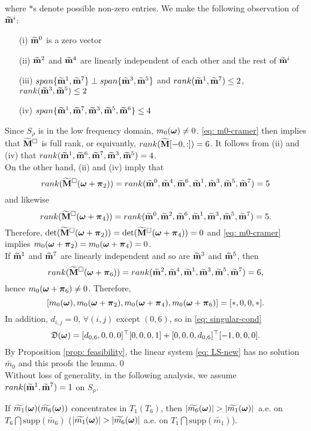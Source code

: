 where $*$s denote possible non-zero entries.
We make the following observation of $\mrow{i}$:
\begin{itemize}
\item[(i)] $\mrow{0}$ is a zero vector
\item[(ii)] $\mrow{2}$ and $\mrow{4}$ are linearly independent of each other and the rest of $\mrow{i}$
\item[(iii)] $span\{\mrow{1},\mrow{7}\} \perp span\{\mrow{3},\mrow{5}\}$ and $rank(\mrow{1},\mrow{7}) \leq 2$, \\$rank(\mrow{3},\mrow{5})\leq 2$
\item[(iv)] $span\{\mrow{1}, \mrow{7}, \mrow{3},\mrow{5},\mrow{6}\} \leq 4$
\end{itemize}
Since $S_\rho$ is in the low frequency domain, $m_0(\V{\omega})\neq 0$. \eqref{eq: m0-cramer} then implies that $\Msub$ is full rank, or equivantly, $rank(\M[-0,:]) = 6$. It follows from  (ii) and (iv) that $rank(\mrow{1},\mrow{6},\mrow{7},\mrow{3},\mrow{5})= 4$.\\
On the other hand, (ii) and (iv) imply that $$rank(\Msub(\V{\omega}+\V{\pi}_2))=rank(\mrow{0},\mrow{4},\mrow{6},\mrow{1},\mrow{3},\mrow{5},\mrow{7})= 5$$ and likewise $$rank(\Msub(\V{\omega}+\V{\pi}_4))=rank(\mrow{0},\mrow{2},\mrow{6},\mrow{1},\mrow{3},\mrow{5},\mrow{7})= 5.$$ Therefore, $\det(\Msub(\V{\omega} + \V{\pi}_2)) = \det(\Msub(\V{\omega} + \V{\pi}_4)) = 0$ and \eqref{eq: m0-cramer} implies $m_0(\V{\omega}+\V{\pi}_2) = m_0(\V{\omega}+\V{\pi}_4) = 0$.\\
If $\mrow{1}$ and $\mrow{7}$ are linearly independent and so are $\mrow{3}$ and $\mrow{5}$, then $$rank(\Msub(\V{\omega}+\V{\pi}_6))=rank(\mrow{2},\mrow{4},\mrow{1},\mrow{3},\mrow{5},\mrow{7}) = 6,$$ hence $m_0(\V{\omega}+\V{\pi}_6)\neq 0$. Therefore, $$[m_0(\V{\omega}),m_0(\V{\omega}+\V{\pi}_2),m_0(\V{\omega}+\V{\pi}_4),m_0(\V{\omega}+\V{\pi}_6)] = [*,0,0,*].$$ In addition, $d_{i,j} = 0,\, \forall(i,j)$ except $(0,6)$, so in \eqref{eq: singular-cond} $$\mathfrak{D}(\V{\omega}) = [d_{0,6}, 0, 0,0]^\top [0,0,0,1] + [0,0,0,d_{0,6}]^\top [-1,0,0,0].$$  By Proposition \ref{prop: feasibility}, the linear system \eqref{eq: LS-new} has no solution $\widetilde{m_0}$ and this proofs the lemma.\qed\\[.5em]
Without loss of generality, in the following analysis, we assume $rank(\mrow{1},\mrow{7}) = 1$ on $S_\rho$.
\begin{lemma}\label{lem: concentrate}
If $\m{1} (\m{6})$ concentrates in $T_1 (T_6)$, then $|\m{6}| > |\m{1}|\,$ a.e. on $T_6\bigcap \text{supp}(\widetilde{m_6})$ ($|\m{1}| > |\m{6}|$ 
a.e. on $T_1\bigcap\text{supp}(\widetilde{m_1})$).
\end{lemma}
